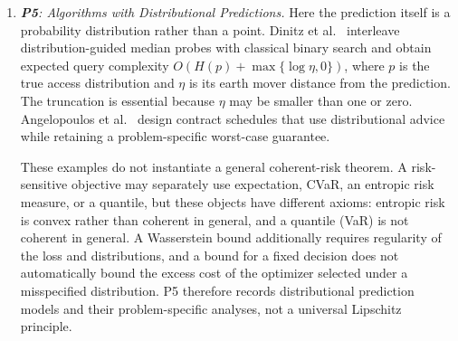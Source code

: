 \documentclass[acmsmall,screen,nonacm]{acmart}
\theoremstyle{acmdefinition}%
\begin{document}
\begin{enumerate}
    Anand et al.~\cite{anand2022multiple} give a potential-based framework for multiple predictions in online covering, while Dinitz et al.~\cite{dinitz2022portfolios} provide problem-specific portfolio algorithms and Antoniadis et al.~\cite{antoniadis2023mixing} analyze combinations for metrical task systems against static or switching-aware benchmarks. Cosa and Eli\'a\v{s}~\cite{cosa2025bandit} restrict each round to one queried MTS predictor. Writing $\mathrm{OPT}_{\leq 0}$ for the cost of the best supplied heuristic, their main regret upper bound is $O(\!\mathrm{OPT}_{\leq 0}^{2/3})$ when the metric diameter, number of predictors, and $m$-delayed-access parameter are treated as constants; the lower bound is $\widetilde{\Omega}(\!\mathrm{OPT}_{\leq 0}^{2/3})$, i.e., tight only up to logarithmic factors. Nguyen~\cite{nguyen2026covering} instead compares online covering decisions with a time-varying linear combination of experts. Sparse-query and costly-prediction models also belong to P4 when they control whether or when a predictor is accessed~\cite{drygala2023costly,im2022parsimonious,sadek2024reduced}. These results justify P4 only under their stated feedback, state, query, and comparator models. Robustness follows when the portfolio contains or is coupled to a robust algorithm and the combination theorem preserves its bound; adversarial regret against a pool of non-robust experts is not sufficient.

    \item \emph{\textbf{P5}: Algorithms with Distributional Predictions.}
    Here the prediction itself is a probability distribution rather than a point. Dinitz et al.~\cite{dinitz2024binarysearch} interleave distribution-guided median probes with classical binary search and obtain expected query complexity $O(H(p)+\max\{\log\eta,0\})$, where $p$ is the true access distribution and $\eta$ is its earth mover distance from the prediction. The truncation is essential because $\eta$ may be smaller than one or zero. Angelopoulos et al.~\cite{angelopoulos2024distributional} design contract schedules that use distributional advice while retaining a problem-specific worst-case guarantee.

    These examples do not instantiate a general coherent-risk theorem. A risk-sensitive objective may separately use expectation, CVaR, an entropic risk measure, or a quantile, but these objects have different axioms: entropic risk is convex rather than coherent in general, and a quantile (VaR) is not coherent in general. A Wasserstein bound additionally requires regularity of the loss and distributions, and a bound for a fixed decision does not automatically bound the excess cost of the optimizer selected under a misspecified distribution. P5 therefore records distributional prediction models and their problem-specific analyses, not a universal Lipschitz principle.

\end{enumerate}
\end{document}
